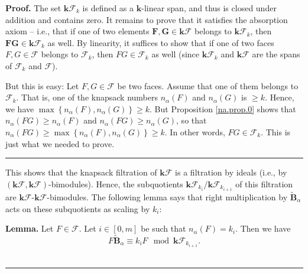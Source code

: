 \documentclass[12pt]{article}
\theoremstyle{definition}%
\newtheorem{lem}[thm]{Lemma}
\theoremstyle{definition}%
\theoremstyle{remark}%
\newcommand{\tup}[1]{\left( #1 \right)}
\newcommand{\interval}[1]{\left[ #1 \right]} %
\newcommand{\set}[1]{\left\{ #1 \right\}}
\newcommand{\kk}{\mathbf{k}}
\newcommand{\kf}{\kk\mathcal{F}}
\newcommand{\BBta}{\widetilde{\mathbf{B}}_{\alpha}}
\newcommand{\FF}{\mathbf{F}}
\newcommand{\GG}{\mathbf{G}}
\newcommand{\CF}{\mathcal{F}}
\newcommand{\na}{n_{ \alpha } }%
\newcommand{\jonathan}[1]{\todo[size=\small,color=yellow!30,inline]{#1 \\ \hfill --- Jonathan}}
\newcommand{\darij}[1]{\todo[size=\small,color=cyan!30,inline]{#1 \\ \hfill --- Darij}}
\newenvironment{lem}[1][Lemma]{\noindent\textbf{#1.} }{\ \rule{0.5em}{0.5em}}
\newenvironment{proof}[1][Proof]{\noindent\textbf{#1.} }{\ \rule{0.5em}{0.5em}}
\begin{document}
\begin{proof}
The set $\kf_k$ is defined as a $\kk$-linear span, and thus is closed under addition and contains zero.
It remains to prove that it satisfies the absorption axiom -- i.e., that if one of two elements $\FF, \GG \in \kf$ belongs to $\kf_k$, then $\FF \GG \in \kf_k$ as well.
By linearity, it suffices to show that if one of two faces $F, G \in \CF$ belongs to $\CF_k$, then $FG \in \CF_k$ as well (since $\kf_k$ and $\kf$ are the spans of $\CF_k$ and $\CF$).

But this is easy:
Let $F, G \in \CF$ be two faces. Assume that one of them belongs to $\CF_k$.
That is, one of the knapsack numbers $\na\tup{F}$ and $\na\tup{G}$ is $\geq k$.
Hence, we have $\max\set{\na\tup{F}, \na\tup{G}} \geq k$.
But Proposition \ref{na.prop.0} shows that
$\na\tup{FG} \geq \na\tup{F}$ and $\na\tup{FG} \geq \na\tup{G}$,
so that
$\na\tup{FG} \geq \max\set{\na\tup{F}, \na\tup{G}} \geq k$.
In other words, $FG \in \CF_k$.
This is just what we needed to prove.
\end{proof}

This shows that the knapsack filtration of $\kf$ is a filtration by ideals (i.e., by $\tup{\kf,\kf}$-bimodules).
Hence, the subquotients $\kf_{k_i} / \kf_{k_{i+1}}$ of this filtration are $\kf$-$\kf$-bimodules.
The following lemma says that right multiplication by $\BBta$ acts on these subquotients as scaling by $k_i$:

\begin{lem}
    \label{main.lem.1}
    Let $ F \in \CF $. Let $i \in \interval{0, m}$ be such that $\na\tup{F} = k_i$. Then we have
    \[
    F\BBta \equiv k_i F  \mod  \kf_{k_{i+1}}.
    \]
\end{lem}
\end{document}
